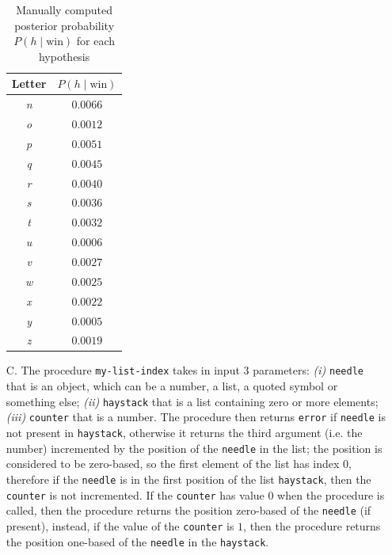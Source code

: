 \begin{itemize}
\begin{table}[H]
\begin{minipage}{.4\linewidth}
\begin{tabular}{c c}
                    \hline
                    \textbf{Letter} & $P(h\;|\;\text{win})$ \\
                    \hline
                    \textit{n} & $0.0066$ \\
                    \textit{o} & $0.0012$ \\
                    \textit{p} & $0.0051$ \\
                    \textit{q} & $0.0045$ \\
                    \textit{r} & $0.0040$ \\
                    \textit{s} & $0.0036$ \\
                    \textit{t} & $0.0032$ \\
                    \textit{u} & $0.0006$ \\
                    \textit{v} & $0.0027$ \\
                    \textit{w} & $0.0025$ \\
                    \textit{x} & $0.0022$ \\
                    \textit{y} & $0.0005$ \\
                    \textit{z} & $0.0019$ \\
                    \hline
                \end{tabular}
            \end{minipage}
            
            \caption{Manually computed posterior probability $P(h\;|\;\text{win})$ for each hypothesis}
            \label{tab:casino-game}
        \end{table}
    \item[C.] The procedure \texttt{my-list-index} takes in input 3 parameters: \textit{(i)} \texttt{needle} that is an object, 
        which can be a number, a list, a quoted symbol or something else; \textit{(ii)} \texttt{haystack} that is a list containing zero 
        or more elements; \textit{(iii)} \texttt{counter} that is a number. 
        The procedure then returns \texttt{\textquotesingle error} if \texttt{needle} is not present in \texttt{haystack}, otherwise it returns the
        third argument (i.e. the number) incremented by the position of the \texttt{needle} in the list; the position is considered to be
        zero-based, so the first element of the list has index $0$, therefore if the \texttt{needle} is in the first position of the list 
        \texttt{haystack}, then the \texttt{counter} is not incremented. If the \texttt{counter} has value $0$ when the procedure is 
        called, then the procedure returns the position zero-based of the \texttt{needle} (if present), instead, if the value of the
        \texttt{counter} is $1$, then the procedure returns the position one-based of the \texttt{needle} in the \texttt{haystack}.
    

\end{itemize}
